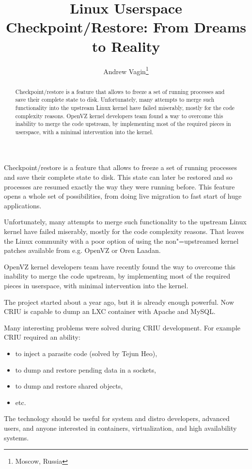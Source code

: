 \documentclass[10pt, a5paper]{article}
\begin{document}
\title{Linux Userspace Checkpoint/Restore: From Dreams to Reality}%

\author{Andrew Vagin\footnote{Moscow, Russia}}
\maketitle

\begin{abstract}
Checkpoint/restore is a feature that allows to freeze a set of running processes and save their complete state to disk. Unfortunately, many attempts to merge such functionality into the upstream Linux kernel have failed miserably, mostly for the code complexity reasons. OpenVZ kernel developers team found a way to overcome this inability to merge the code upstream, by implementing most of the required pieces in userspace, with a minimal intervention into the kernel.
\end{abstract}

Checkpoint/restore is a feature that allows to freeze a set of running processes and save their complete state to disk. This state can later be restored and so processes are resumed exactly the way they were running before. This feature opens a whole set of possibilities, from doing live migration to fast start of huge applications.

Unfortunately, many attempts to merge such functionality to the upstream Linux kernel have failed miserably, mostly for the code complexity reasons. That leaves the Linux community with a poor option of using the non"=upstreamed kernel patches available from e.g. OpenVZ or Oren Laadan.

OpenVZ kernel developers team have recently found the way to overcome this inability to merge the code upstream, by implementing most of the required pieces in userspace, with minimal intervention into the kernel.

The project started about a year ago, but it is already enough powerful. Now CRIU is capable to dump an LXC container with Apache and MySQL.

Many interesting problems were solved during CRIU development.
For example CRIU required an ability:

\begin{itemize}
  \item to inject a parasite code (solved by Tejun Heo),
  \item to dump and restore pending data in a sockets,
  \item to dump and restore shared objects,
  \item etc.
\end{itemize}

The technology should be useful for system and distro developers, advanced users, and anyone interested in containers, virtualization, and high availability systems.
\end{document}
